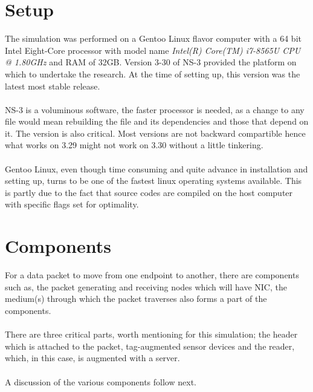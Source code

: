 \section{Setup}
The simulation was performed on a Gentoo Linux flavor computer with a 64 bit Intel
Eight-Core processor with model name \textit{Intel(R) Core(TM) i7-8565U CPU @
1.80GHz} and RAM of 32GB. Version 3-30 of NS-3 provided the platform on which to
undertake the research. At the time of setting up, this version was the latest most
stable release.\\\\
NS-3 is a voluminous software, the faster processor is needed, as a change to any
file would mean rebuilding the file and its dependencies and those that depend on it.
The version is also critical. Most versions are not backward compartible hence what
works on 3.29 might not work on 3.30 without a little tinkering.\\\\
Gentoo Linux, even though time consuming and quite advance in installation and
setting up, turns to be one of the fastest linux operating systems available. This is
partly due to the fact that source codes are compiled on the host computer with 
specific flags set for optimality.

\section{Components}
For a data packet to move from one endpoint to another, there are components such as,
the packet generating and receiving nodes which will have NIC, the medium(s) through
which the packet traverses also forms a part of the components.\\\\
There are three critical parts, worth mentioning for this simulation; the header which
is attached to the packet, tag-augmented sensor devices and the reader, which, in this
case, is augmented with a server.\\\\
A discussion of the various components follow next.
